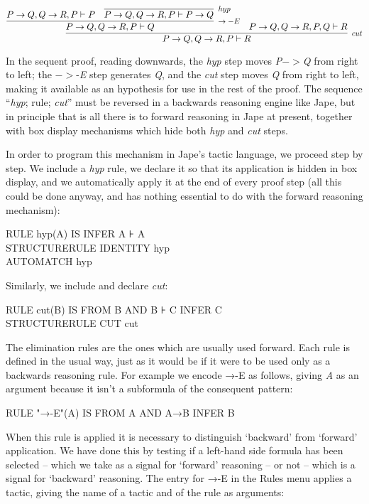 \documentclass[11pt]{book}
\newcommand{\reason}[1]{\scalebox{0.85}{#1}}
\begin{document}
$\infer[\reason{$cut$}]
       {P->Q,Q->R,P |- R}
       {\infer[\reason{$->-E$}]
              {P->Q,Q->R,P |- Q}
              {P->Q,Q->R,P |- P &
               \infer[\reason{$hyp$}]
                     {P->Q,Q->R,P |- P->Q} {}} &
        P->Q,Q->R,P,Q |- R}$

In the sequent proof, reading downwards, the \textit{hyp} step moves \textit{P}\ensuremath{->}\textit{Q} from right to left; the \ensuremath{->}-\textit{E} step generates \textit{Q}, and the \textit{cut} step moves \textit{Q} from right to left, making it available as an hypothesis for use in the rest of the proof. The sequence ``\textit{hyp}; rule; \textit{cut}'' must be reversed in a backwards reasoning engine like Jape, but in principle that is all there is to forward reasoning in Jape at present, together with box display mechanisms which hide both \textit{hyp} and \textit{cut} steps.


In order to program this mechanism in Jape's tactic language, we proceed step by step. We include a \textit{hyp} rule, we declare it so that its application is hidden in box display, and we automatically apply it at the end of every proof step (all this could be done anyway, and has nothing essential to do with the forward reasoning mechanism):

RULE hyp(A) IS INFER A ⊦ A\\
STRUCTURERULE IDENTITY hyp\\
AUTOMATCH hyp


Similarly, we include and declare \textit{cut}:

RULE cut(B) IS FROM B AND B ⊦ C INFER C\\
STRUCTURERULE CUT cut


The elimination rules are the ones which are usually used forward. Each rule is defined in the usual way, just as it would be if it were to be used only as a backwards reasoning rule. For example we encode →-E as follows, giving \textit{A} as an argument because it isn't a subformula of the consequent pattern:

RULE "→-E"(A) IS FROM A AND A→B INFER B


When this rule is applied it is necessary to distinguish `backward' from `forward' application. We have done this by testing if a left-hand side formula has been selected -- which we take as a signal for `forward' reasoning -- or not -- which is a signal for `backward' reasoning. The entry for →-E in the Rules menu applies a tactic, giving the name of a tactic and of the rule as arguments:
\end{document}
